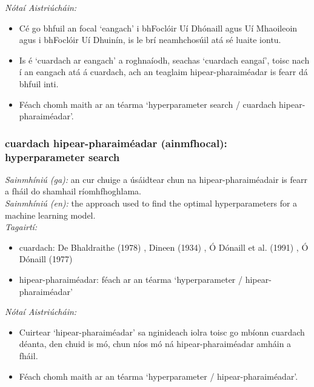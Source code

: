  \noindent \textit{Nótaí Aistriúcháin:}
\begin{itemize}
	\item Cé go bhfuil an focal `eangach' i bhFoclóir Uí Dhónaill agus Uí Mhaoileoin agus i bhFoclóir Uí Dhuinín, is le brí neamhchosúil atá sé luaite iontu.
	\item Is é `cuardach ar eangach' a roghnaíodh, seachas `cuardach eangaí', toisc nach í an eangach atá á cuardach, ach an teaglaim hipear-pharaiméadar is fearr dá bhfuil inti.
	\item Féach chomh maith ar an téarma `hyperparameter search / cuardach hipear-pharaiméadar'.
\end{itemize}


\subsubsection*{cuardach hipear-pharaiméadar (ainmfhocal): hyperparameter search}
 \noindent \textit{Sainmhíniú (ga):} an cur chuige a úsáidtear chun na hipear-pharaiméadair is fearr a fháil do shamhail ríomhfhoghlama.
\\
 \noindent \textit{Sainmhíniú (en):} the approach used to find the optimal hyperparameters for a machine learning model.
\\
 \noindent \textit{Tagairtí:}
\begin{itemize}
	\item cuardach: De Bhaldraithe (1978) \cite{de-bhaldraithe}, Dineen (1934) \cite{dineen}, Ó Dónaill et al. (1991) \cite{focloir-beag}, Ó Dónaill (1977) \cite{odonaill}
	\item hipear-pharaiméadar: féach ar an téarma `hyperparameter / hipear-pharaiméadar'
\end{itemize}

 \noindent \textit{Nótaí Aistriúcháin:}
\begin{itemize}
	\item Cuirtear `hipear-pharaiméadar' sa nginideach iolra toisc go mbíonn cuardach déanta, den chuid is mó, chun níos mó ná hipear-pharaiméadar amháin a fháil.
	\item Féach chomh maith ar an téarma `hyperparameter / hipear-pharaiméadar'.
\end{itemize}


